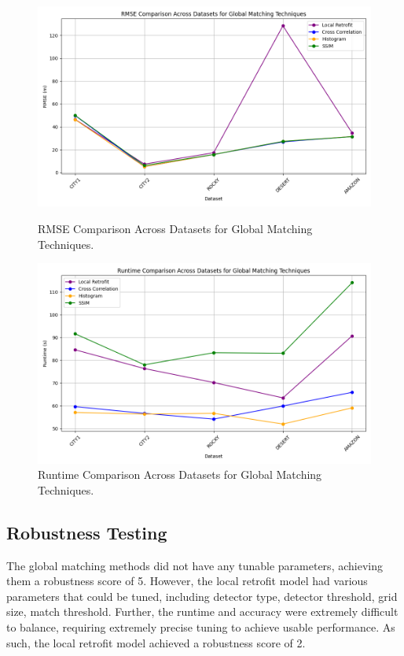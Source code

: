 \begin{figure}[H]
    \centering
    \begin{minipage}{0.45\textwidth}
        \centering
        \includegraphics[width=\textwidth]{./Chapter 4/testresults/rmse_global_matching.png}
        \caption{RMSE Comparison Across Datasets for Global Matching Techniques.}
        \label{fig:rmse_global_matching}
    \end{minipage}\hfill
    \begin{minipage}{0.45\textwidth}
        \centering
        \includegraphics[width=\textwidth]{./Chapter 4/testresults/runtime_global_matching.png}
        \caption{Runtime Comparison Across Datasets for Global Matching Techniques.}
        \label{fig:runtime_global_matching}
    \end{minipage}
\end{figure}

\subsection{Robustness Testing}
The global matching methods did not have any tunable parameters, achieving them a robustness score of 5. However, the local retrofit model had various parameters that could be tuned, including detector type, detector threshold, grid size, match threshold. Further, the runtime and accuracy were extremely difficult to balance, requiring extremely precise tuning to achieve usable performance. As such, the local retrofit model achieved a robustness score of 2. 



